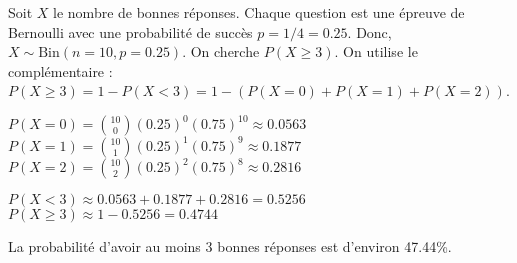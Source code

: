 \begin{correctionbox}
Soit $X$ le nombre de bonnes réponses. Chaque question est une épreuve de Bernoulli avec une probabilité de succès $p = 1/4 = 0.25$. Donc, $X \sim \text{Bin}(n=10, p=0.25)$.
On cherche $P(X \ge 3)$. On utilise le complémentaire : $P(X \ge 3) = 1 - P(X < 3) = 1 - (P(X=0) + P(X=1) + P(X=2))$.

$P(X=0) = \binom{10}{0}(0.25)^0(0.75)^{10} \approx 0.0563$
$P(X=1) = \binom{10}{1}(0.25)^1(0.75)^9 \approx 0.1877$
$P(X=2) = \binom{10}{2}(0.25)^2(0.75)^8 \approx 0.2816$

$P(X < 3) \approx 0.0563 + 0.1877 + 0.2816 = 0.5256$
$P(X \ge 3) \approx 1 - 0.5256 = 0.4744$

La probabilité d'avoir au moins 3 bonnes réponses est d'environ 47.44\%.
\end{correctionbox}